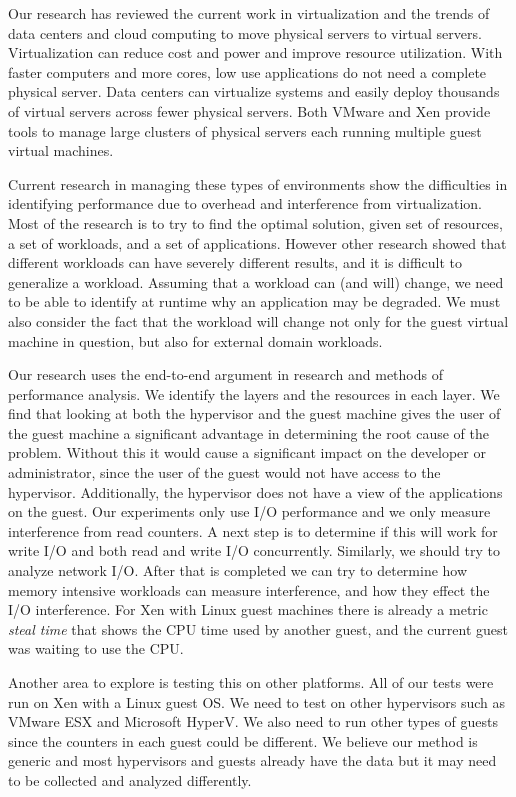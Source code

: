 Our research has reviewed the current work in virtualization and the trends of data centers and cloud computing to move physical servers to virtual servers.  Virtualization can reduce cost and power and improve resource utilization.  With faster computers and more cores, low use applications do not need a complete physical server.  Data centers can virtualize systems and easily deploy thousands of virtual servers across fewer physical servers.  Both VMware and Xen provide tools to manage large clusters of physical servers each running multiple guest virtual machines.

Current research in managing these types of environments show the difficulties in identifying performance due to overhead and interference from virtualization.  Most of the research is to try to find the optimal solution, given set of resources, a set of workloads, and a set of applications.  However other research showed that different workloads can have severely different results, and it is difficult to generalize a workload.  Assuming that a workload can (and will) change, we need to be able to identify at runtime why an application may be degraded.  We must also consider the fact that the workload will change not only for the guest virtual machine in question, but also for external domain workloads. 

Our research uses the end-to-end argument in research and methods of performance analysis.  We identify the layers and the resources in each layer.  We find that looking at both the hypervisor and the guest machine gives the user of the guest machine a significant advantage in determining the root cause of the problem.  Without this it would cause a significant impact on the developer or administrator, since the user of the guest would not have access to the hypervisor.  Additionally, the hypervisor does not have a view of the applications on the guest.  
Our experiments only use I/O performance and we only measure interference from read counters.  A next step is to determine if this will work for write I/O and both read and write I/O concurrently. Similarly, we should try to analyze network I/O. After that is completed we can try to determine how memory intensive workloads can measure interference, and how they effect the I/O interference.  For Xen with Linux guest machines there is already a metric \emph{steal time} that shows the CPU time used by another guest, and the current guest was waiting to use the CPU.

Another area to explore is testing this on other platforms.  All of our tests were run on Xen with a Linux guest OS.  We need to test on other hypervisors such as VMware ESX and Microsoft HyperV.  We also need to run other types of guests since the counters in each guest could be different.  We believe our method is generic and most hypervisors and guests already have the data but it may need to be collected and analyzed differently.


